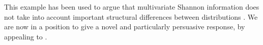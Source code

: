 This example has been used to argue that multivariate Shannon
    information does not take into account important structural
    differences between distributions \citep{multivar-beyondshannon17}.
We are now in a position to give a novel and particularly persuasive response, by appealing to \scibility.%
